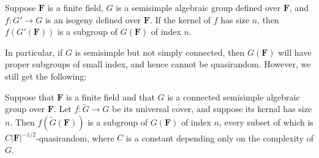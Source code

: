 \documentclass[10pt]{article}
\begin{document}
{\begin{fact}
    Suppose $\mathbf{F}$ is a finite field, $G$ is a semisimple algebraic group defined over $\mathbf{F}$, and $f:G'\to G$ is an isogeny defined over $\mathbf{F}$. If the kernel of $f$ has size $n$, then $f(G'(\mathbf{F}))$ is a subgroup of $G(\mathbf{F})$ of index $n$.
\end{fact}

In particular, if $G$ is semisimple but not simply connected, then $G(\mathbf{F})$ will have proper subgroups of small index, and hence cannot be quasirandom. However, we still get the following:

\begin{proposition}
    Suppose that $\mathbf{F}$ is a finite field and that $G$ is a connected semisimple algebraic group over $\mathbf{F}$. Let $f:\tilde{G}\to G$ be its universal cover, and suppose its kernal has size $n$. Then $f(\tilde{G}(\mathbf{F}))$ is a subgroup of $G(\mathbf{F})$ of index $n$, every subset of which is $C|\mathbf{F}|^{-1/2}$-quasirandom, where $C$ is a constant depending only on the complexity of $G$.
\end{proposition}


}
\newpage
\end{document}
